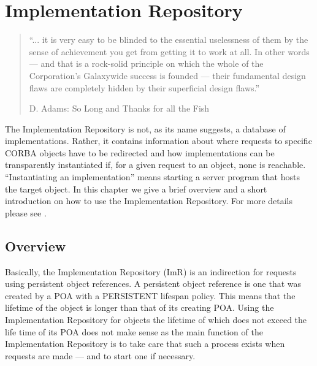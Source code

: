 \documentclass[12pt]{scrbook}
\begin{document}
\chapter{Implementation Repository}
\label{Ch_Imr}

\begin{quote}
``...  it is  very easy to be blinded to  the essential uselessness of
them by  the sense of achievement you  get from getting it  to work at
all.  In other  words --- and that is a  rock-solid principle on which
the whole of the Corporation's Galaxywide success is founded --- their
fundamental design  flaws are  completely hidden by  their superficial
design flaws.''

             D. Adams: So Long and Thanks for all the Fish
\end{quote}

The Implementation Repository is not, as its name suggests, a database
of  implementations.   Rather,  it  contains information  about  where
requests  to specific  CORBA objects  have  to be  redirected and  how
implementations  can be  transparently  instantiated if,  for a  given
request  to   an  object,  none  is   reachable.   ``Instantiating  an
implementation'' means starting a server program that hosts the target
object.  In  this  chapter  we  give  a brief  overview  and  a  short
introduction  on how to  use the  Implementation Repository.  For more
details please see \cite{Henning1999}.

\section{Overview}

Basically, the  Implementation Repository (ImR) is  an indirection for
requests  using  persistent  object  references. A  persistent  object
reference is one that was created  by a POA with a PERSISTENT lifespan
policy. This means that the lifetime of the object is longer than that
of its creating POA.   Using the Implementation Repository for objects
the lifetime  of which does not exceed  the life time of  its POA does
not make sense  as the main function of  the Implementation Repository
is to take care that such  a process exists when requests are made ---
and to start one if necessary.
\end{document}
